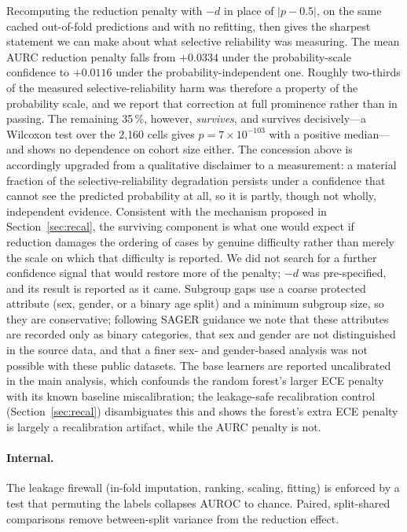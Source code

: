 \documentclass[fleqn,10pt]{wlscirep}
\newcommand{\result}[1]{#1}
\begin{document}
Recomputing the reduction penalty with $-d$ in place of $|p-0.5|$, on the same cached out-of-fold
predictions and with no refitting, then gives the sharpest statement we can make about what selective
reliability was measuring. The mean AURC reduction penalty falls from \result{$+0.0334$} under the
probability-scale confidence to \result{$+0.0116$} under the probability-independent one. Roughly
\result{two-thirds} of the measured selective-reliability harm was therefore a property of the
probability scale, and we report that correction at full prominence rather than in passing. The
remaining \result{35\,\%}, however, \emph{survives}, and survives decisively---a Wilcoxon test over
the \result{2{,}160} cells gives $p=\result{7\times10^{-103}}$ with a positive median---and shows no
dependence on cohort size either. The concession above is accordingly upgraded from a qualitative
disclaimer to a measurement: a material fraction of the selective-reliability degradation persists
under a confidence that cannot see the predicted probability at all, so it is partly, though not
wholly, independent evidence. Consistent with the mechanism proposed in
Section~\ref{sec:recal}, the surviving component is what one would expect if reduction damages the
ordering of cases by genuine difficulty rather than merely the scale on which that difficulty is
reported. We did not search for a further confidence signal that would restore more of the penalty;
$-d$ was pre-specified, and its result is reported as it came. Subgroup gaps use a coarse
protected attribute (sex, gender, or a binary age split) and a minimum subgroup size, so they
are conservative; following SAGER guidance we note that these attributes are recorded only as
binary categories, that sex and gender are not distinguished in the source data, and that a finer
sex- and gender-based analysis was not possible with these public datasets. The base learners are reported uncalibrated in the main analysis, which confounds
the random forest's larger ECE penalty with its known baseline miscalibration; the leakage-safe
recalibration control (Section~\ref{sec:recal}) disambiguates this and shows the forest's extra ECE
penalty is largely a recalibration artifact, while the AURC penalty is not.

\paragraph{Internal.} The leakage firewall (in-fold imputation, ranking, scaling, fitting) is
enforced by a test that permuting the labels collapses AUROC to chance. Paired, split-shared
comparisons remove between-split variance from the reduction effect.
\end{document}
